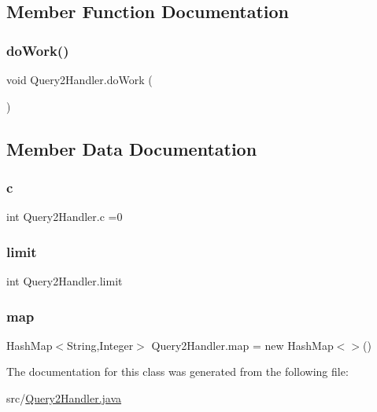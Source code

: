 \subsection{Member Function Documentation}
\hypertarget{class_query2_handler_a29ff96d28d8af3b389f7a927aa88ef94}{}\label{class_query2_handler_a29ff96d28d8af3b389f7a927aa88ef94} 
\subsubsection{\texorpdfstring{do\+Work()}{doWork()}}
{\footnotesize\ttfamily void Query2\+Handler.\+do\+Work (\begin{DoxyParamCaption}{ }\end{DoxyParamCaption})}



\subsection{Member Data Documentation}
\hypertarget{class_query2_handler_a12fe19bdbd73d5b13d49f302d2184fa8}{}\label{class_query2_handler_a12fe19bdbd73d5b13d49f302d2184fa8} 
\subsubsection{\texorpdfstring{c}{c}}
{\footnotesize\ttfamily int Query2\+Handler.\+c =0\hspace{0.3cm}{\ttfamily [private]}}

\hypertarget{class_query2_handler_a086e6c46abd14506f22fb5d1d623d2b0}{}\label{class_query2_handler_a086e6c46abd14506f22fb5d1d623d2b0} 
\subsubsection{\texorpdfstring{limit}{limit}}
{\footnotesize\ttfamily int Query2\+Handler.\+limit\hspace{0.3cm}{\ttfamily [private]}}

\hypertarget{class_query2_handler_acf4cc7d926ce0efea12e03974fafda1c}{}\label{class_query2_handler_acf4cc7d926ce0efea12e03974fafda1c} 
\subsubsection{\texorpdfstring{map}{map}}
{\footnotesize\ttfamily Hash\+Map$<$String,Integer$>$ Query2\+Handler.\+map = new Hash\+Map$<$$>$()\hspace{0.3cm}{\ttfamily [private]}}



The documentation for this class was generated from the following file\+:\begin{DoxyCompactItemize}
\item 
src/\hyperlink{_query2_handler_8java}{Query2\+Handler.\+java}\end{DoxyCompactItemize}
